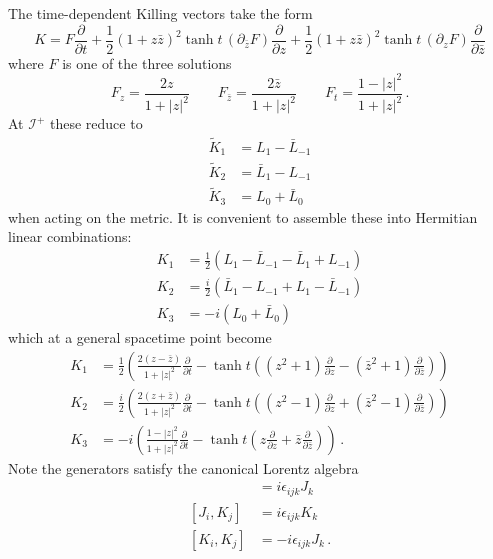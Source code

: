 \documentclass{brownthesis}
\begin{document}
The time-dependent Killing vectors take the form
\[
K=F\frac{\partial}{\partial t}+\frac{1}{2}\left(1+z\bar{z}\right)^{2}\tanh t\,\left(\partial_{\bar{z}}F\right)\frac{\partial}{\partial z}+\frac{1}{2}\left(1+z\bar{z}\right)^{2}\tanh t\,\left(\partial_{z}F\right)\frac{\partial}{\partial\bar{z}}
\]
where $F$ is one of the three solutions
\begin{equation}
F_{z}=\frac{2z}{1+|z|^{2}}\qquad F_{\bar{z}}=\frac{2\bar{z}}{1+|z|^{2}}\qquad F_{t}=\frac{1-|z|^{2}}{1+|z|^{2}}\,.\label{eq:cartesian}
\end{equation}
At $\mathcal{I}^{+}$ these reduce to
\begin{align*}
\tilde{K}_{1} & =L_{1}-\bar{L}_{-1}\\
\tilde{K}_{2} & =\bar{L}_{1}-L_{-1}\\
\tilde{K}_{3} & =L_{0}+\bar{L}_{0}
\end{align*}
when acting on the metric. It is convenient to assemble these into
Hermitian linear combinations:
\begin{align*}
K_{1} & =\frac{1}{2}\left(L_{1}-\bar{L}_{-1}-\bar{L}_{1}+L_{-1}\right)\\
K_{2} & =\frac{i}{2}\left(\bar{L}_{1}-L_{-1}+L_{1}-\bar{L}_{-1}\right)\\
K_{3} & =-i\left(L_{0}+\bar{L}_{0}\right)
\end{align*}
which at a general spacetime point become
\begin{align}
K_{1} & =\frac{1}{2}\left(\frac{2(z-\bar{z})}{1+|z|^{2}}\frac{\partial}{\partial t}-\tanh t\left(\left(z^{2}+1\right)\frac{\partial}{\partial z}-\left(\bar{z}^{2}+1\right)\frac{\partial}{\partial\bar{z}}\right)\right)\nonumber \\
K_{2} & =\frac{i}{2}\left(\frac{2(z+\bar{z})}{1+|z|^{2}}\frac{\partial}{\partial t}-\tanh t\left(\left(z^{2}-1\right)\frac{\partial}{\partial z}+\left(\bar{z}^{2}-1\right)\frac{\partial}{\partial\bar{z}}\right)\right)\nonumber \\
K_{3} & =-i\left(\frac{1-|z|^{2}}{1+|z|^{2}}\frac{\partial}{\partial t}-\tanh t\left(z\frac{\partial}{\partial z}+\bar{z}\frac{\partial}{\partial\bar{z}}\right)\right)\,.\label{eq:bulkgen}
\end{align}
Note the generators satisfy the canonical Lorentz algebra
\begin{align*}
[J_{i},J_{j}] & =i\epsilon_{ijk}J_{k}\\{}
[J_{i},K_{j}] & =i\epsilon_{ijk}K_{k}\\{}
[K_{i},K_{j}] & =-i\epsilon_{ijk}J_{k}\,.
\end{align*}
\end{document}

